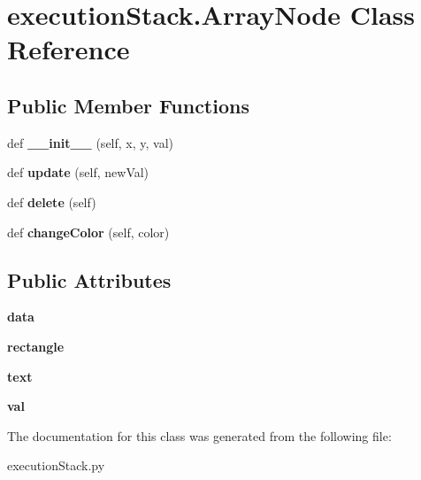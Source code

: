 \hypertarget{classexecution_stack_1_1_array_node}{}\section{execution\+Stack.\+Array\+Node Class Reference}
\label{classexecution_stack_1_1_array_node}
\subsection*{Public Member Functions}
\begin{DoxyCompactItemize}
\item 
def {\bfseries \+\_\+\+\_\+init\+\_\+\+\_\+} (self, x, y, val)\hypertarget{classexecution_stack_1_1_array_node_a77706dea871f1d386358a73040e5dea3}{}\label{classexecution_stack_1_1_array_node_a77706dea871f1d386358a73040e5dea3}

\item 
def {\bfseries update} (self, new\+Val)\hypertarget{classexecution_stack_1_1_array_node_ad2f67bb5aff43e472147fd8b6c437662}{}\label{classexecution_stack_1_1_array_node_ad2f67bb5aff43e472147fd8b6c437662}

\item 
def {\bfseries delete} (self)\hypertarget{classexecution_stack_1_1_array_node_ac61da4f274e4fdaf71cc76e1c77d21a0}{}\label{classexecution_stack_1_1_array_node_ac61da4f274e4fdaf71cc76e1c77d21a0}

\item 
def {\bfseries change\+Color} (self, color)\hypertarget{classexecution_stack_1_1_array_node_afe1ddcc32a2d47d16b16c39b9a79ecbc}{}\label{classexecution_stack_1_1_array_node_afe1ddcc32a2d47d16b16c39b9a79ecbc}

\end{DoxyCompactItemize}
\subsection*{Public Attributes}
\begin{DoxyCompactItemize}
\item 
{\bfseries data}\hypertarget{classexecution_stack_1_1_array_node_afb62811ca045506e06a377713425033b}{}\label{classexecution_stack_1_1_array_node_afb62811ca045506e06a377713425033b}

\item 
{\bfseries rectangle}\hypertarget{classexecution_stack_1_1_array_node_a94d21c229777c52da0d5552a7883821d}{}\label{classexecution_stack_1_1_array_node_a94d21c229777c52da0d5552a7883821d}

\item 
{\bfseries text}\hypertarget{classexecution_stack_1_1_array_node_ad4730d0b91ec85244f3e3e6bf6faf1a1}{}\label{classexecution_stack_1_1_array_node_ad4730d0b91ec85244f3e3e6bf6faf1a1}

\item 
{\bfseries val}\hypertarget{classexecution_stack_1_1_array_node_a95f1b1902891cf3fb239bece841e4bb5}{}\label{classexecution_stack_1_1_array_node_a95f1b1902891cf3fb239bece841e4bb5}

\end{DoxyCompactItemize}


The documentation for this class was generated from the following file\+:\begin{DoxyCompactItemize}
\item 
execution\+Stack.\+py\end{DoxyCompactItemize}
